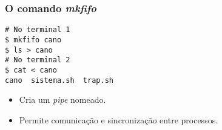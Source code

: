 \documentclass{beamer}
\begin{document}

   \begin{frame}[fragile]
      \frametitle{O comando \textit{mkfifo}}
      \begin{verbatim}
# No terminal 1
$ mkfifo cano
$ ls > cano
# No terminal 2
$ cat < cano
cano  sistema.sh  trap.sh
      \end{verbatim}
      \begin{itemize}
         \item Cria um \textit{pipe} nomeado.
         \item Permite comunicação e sincronização entre processos.
      \end{itemize}
\end{frame}
\end{document}
